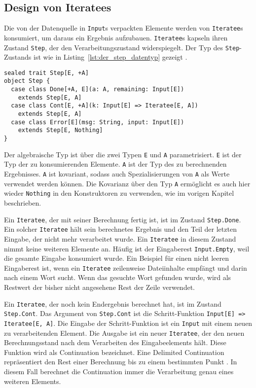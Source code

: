

\subsection{Design von Iteratees} %
\label{sub:design_iteratees}

Die von der Datenquelle in \lstinline|Input|s verpackten Elemente werden von \lstinline|Iteratee|s konsumiert, um daraus ein Ergebnis aufzubauen.
\lstinline|Iteratee|s kapseln ihren Zustand \lstinline|Step|, der den Verarbeitungszustand widerspiegelt.
Der Typ des \lstinline|Step|-Zustands ist wie in Listing~\ref{lst:der_step_datentyp} gezeigt \cite[vgl.][Z.~256]{play_iteratee_source_code}.
\begin{lstlisting}[caption=Der Step-Datentyp, label=lst:der_step_datentyp]
sealed trait Step[E, +A]
object Step {
  case class Done[+A, E](a: A, remaining: Input[E])
    extends Step[E, A]
  case class Cont[E, +A](k: Input[E] => Iteratee[E, A])
    extends Step[E, A]
  case class Error[E](msg: String, input: Input[E])
    extends Step[E, Nothing]
}
\end{lstlisting}

Der algebraische Typ ist über die zwei Typen \lstinline|E| und \lstinline|A| parametrisiert.
\lstinline|E| ist der Typ der zu konsumierenden Elemente.
\lstinline|A| ist der Typ des zu berechnenden Ergebnisses.
\lstinline|A| ist kovariant, sodass auch Spezialisierungen von \lstinline|A| als Werte verwendet werden können.
Die Kovarianz über den Typ \lstinline|A| ermöglicht es auch hier wieder \lstinline|Nothing| in den Konstruktoren zu verwenden, wie im vorigen Kapitel beschrieben.

Ein \lstinline|Iteratee|, der mit seiner Berechnung fertig ist, ist im Zustand \lstinline|Step.Done|.
Ein solcher \lstinline|Iteratee| hält sein berechnetes Ergebnis und den Teil der letzten Eingabe, der nicht mehr verarbeitet wurde.
Ein \lstinline|Iteratee| in diesem Zustand nimmt keine weiteren Elemente an.
Häufig ist der Eingaberest \lstinline|Input.Empty|, weil die gesamte Eingabe konsumiert wurde.
Ein Beispiel für einen nicht leeren Eingaberest ist, wenn ein \lstinline|Iteratee| zeilenweise Dateiinhalte empfängt und darin nach einem Wort sucht.
Wenn das gesuchte Wort gefunden wurde, wird als Restwert der bisher nicht angesehene Rest der Zeile verwendet.

Ein \lstinline|Iteratee|, der noch kein Endergebnis berechnet hat, ist im Zustand \lstinline|Step.Cont|.
Das Argument von \lstinline|Step.Cont| ist die Schritt-Funktion \lstinline[breaklines=true]|Input[E] => Iteratee[E, A]|.
Die Eingabe der Schritt-Funktion ist ein \lstinline|Input| mit einem neuen zu verarbeitenden Element.
Die Ausgabe ist ein neuer \lstinline|Iteratee|, der den neuen Berechnungsstand nach dem Verarbeiten des Eingabeelements hält.
Diese Funktion wird als Continuation bezeichnet.
Eine Delimited Continuation repräsentiert den Rest einer Berechnung bis zu einem bestimmten Punkt \cite[vgl.][S.~1]{continuations}.
In diesem Fall berechnet die Continuation immer die Verarbeitung genau eines weiteren Elements.

